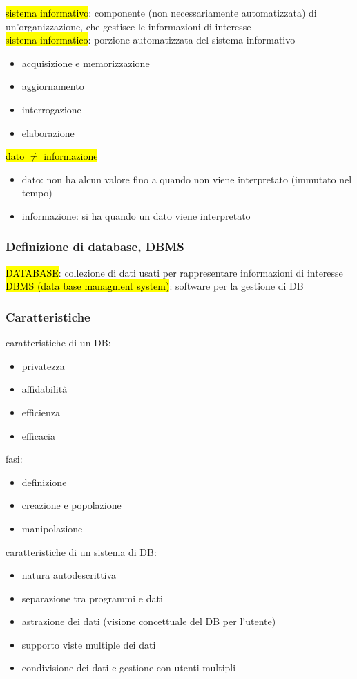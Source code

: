 \documentclass[a4paper]{article}
\begin{document}
\hl{sistema informativo}: componente (non necessariamente automatizzata) di un’organizzazione, che gestisce le informazioni di interesse\medskip\\
%
\hl{sistema informatico}: porzione automatizzata del sistema informativo
\begin{itemize}[noitemsep]
  \item acquisizione e memorizzazione
  \item aggiornamento
  \item interrogazione
  \item elaborazione
\end{itemize}
%
\hl{dato $\neq$ informazione}
\begin{itemize}[noitemsep]
  \item dato: non ha alcun valore fino a quando non viene interpretato (immutato nel tempo)
  \item informazione: si ha quando un dato viene interpretato
\end{itemize}

\subsubsection{Definizione di database, DBMS}
\hl{DATABASE}: collezione di dati usati per rappresentare informazioni di interesse\\
\hl{DBMS (data base managment system)}: software per la gestione di DB

\subsubsection{Caratteristiche}
caratteristiche di un DB:
\begin{itemize}[noitemsep]
  \item privatezza
  \item affidabilità
  \item efficienza
  \item efficacia
\end{itemize}
%
fasi:
\begin{itemize}[noitemsep]
  \item definizione
  \item creazione e popolazione
  \item manipolazione
\end{itemize}
%
caratteristiche di un sistema di DB:
\begin{itemize}[noitemsep]
  \item natura autodescrittiva
  \item separazione tra programmi e dati
  \item astrazione dei dati (visione concettuale del DB per l'utente)
  \item supporto viste multiple dei dati
  \item condivisione dei dati e gestione con utenti multipli
\end{itemize}
%
\end{document}
